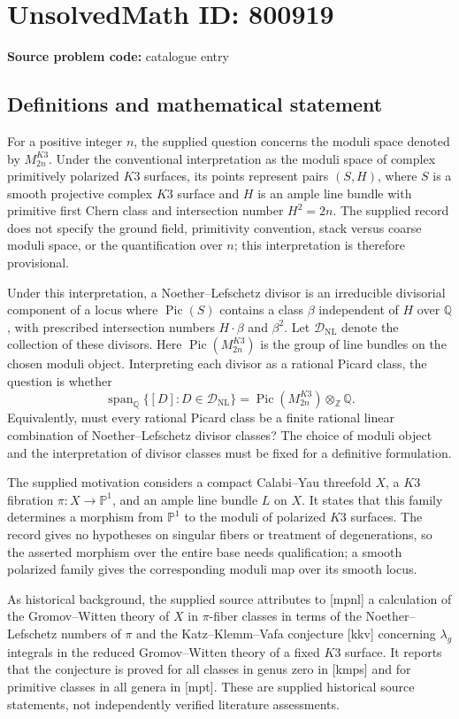 \documentclass[11pt]{article}
\newcommand{\Z}{\mathbb{Z}}
\newcommand{\Q}{\mathbb{Q}}
\newcommand{\PP}{\mathbb{P}}
\begin{document}
\section*{UnsolvedMath ID: 800919}
\textbf{Source problem code:} catalogue entry
\subsection{Definitions and mathematical statement}
For a positive integer \(n\), the supplied question concerns the moduli space denoted by \(M^{K3}_{2n}\). Under the conventional interpretation as the moduli space of complex primitively polarized \(K3\) surfaces, its points represent pairs \((S,H)\), where \(S\) is a smooth projective complex \(K3\) surface and \(H\) is an ample line bundle with primitive first Chern class and intersection number \(H^2=2n\). The supplied record does not specify the ground field, primitivity convention, stack versus coarse moduli space, or the quantification over \(n\); this interpretation is therefore provisional.

Under this interpretation, a Noether--Lefschetz divisor is an irreducible divisorial component of a locus where \(\operatorname{Pic}(S)\) contains a class \(\beta\) independent of \(H\) over \(\Q\), with prescribed intersection numbers \(H\cdot\beta\) and \(\beta^2\). Let \(\mathcal D_{\mathrm{NL}}\) denote the collection of these divisors. Here \(\operatorname{Pic}(M^{K3}_{2n})\) is the group of line bundles on the chosen moduli object. Interpreting each divisor as a rational Picard class, the question is whether
\[
\operatorname{span}_{\Q}\bigl\{[D]:D\in\mathcal D_{\mathrm{NL}}\bigr\}
=
\operatorname{Pic}(M^{K3}_{2n})\otimes_{\Z}\Q.
\]
Equivalently, must every rational Picard class be a finite rational linear combination of Noether--Lefschetz divisor classes? The choice of moduli object and the interpretation of divisor classes must be fixed for a definitive formulation.

The supplied motivation considers a compact Calabi--Yau threefold \(X\), a \(K3\) fibration \(\pi:X\to\PP^1\), and an ample line bundle \(L\) on \(X\). It states that this family determines a morphism from \(\PP^1\) to the moduli of polarized \(K3\) surfaces. The record gives no hypotheses on singular fibers or treatment of degenerations, so the asserted morphism over the entire base needs qualification; a smooth polarized family gives the corresponding moduli map over its smooth locus.

As historical background, the supplied source attributes to [mpnl] a calculation of the Gromov--Witten theory of \(X\) in \(\pi\)-fiber classes in terms of the Noether--Lefschetz numbers of \(\pi\) and the Katz--Klemm--Vafa conjecture [kkv] concerning \(\lambda_g\) integrals in the reduced Gromov--Witten theory of a fixed \(K3\) surface. It reports that the conjecture is proved for all classes in genus zero in [kmps] and for primitive classes in all genera in [mpt]. These are supplied historical source statements, not independently verified literature assessments.
\end{document}
